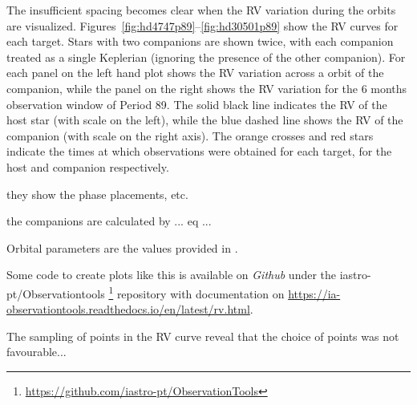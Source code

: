 The insufficient spacing becomes clear when the RV variation during the orbits are visualized. Figures~\ref{fig:hd4747p89}--\ref{fig:hd30501p89} show the RV curves for each target. 
Stars with two companions are shown twice, with each companion treated as a single Keplerian (ignoring the presence of the other companion).
For each panel on the left hand plot shows the RV variation across a orbit of the companion, while the panel on the right shows the RV variation for the 6 months observation window of Period 89.
The solid black line indicates the RV of the host star (with scale on the left), while the blue dashed line shows the RV of the companion (with scale on the right axis). 
The orange crosses and red stars indicate the times at which observations were obtained for each target, for the host and companion respectively.

they show the phase placements, etc.

the companions are calculated by ... eq ...

Orbital parameters are the values provided in .
    
Some code to create plots like this is available on \textit{Github} under the iastro-pt/Observationtools \footnote{\href{https://github.com/iastro-pt/ObservationTools}{https://github.com/iastro-pt/ObservationTools}} repository with documentation on \href{Read the Docs}{https://ia-observationtools.readthedocs.io/en/latest/rv.html}.



The sampling of points in the RV curve reveal that the choice of points was not favourable...



